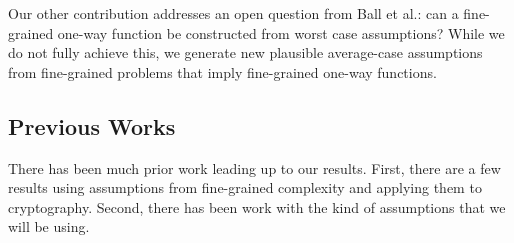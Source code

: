 

Our other contribution addresses an open question from Ball et al.: can a fine-grained one-way function be constructed from worst case assumptions? While we do not fully achieve this, we generate new plausible average-case assumptions from fine-grained problems that imply fine-grained one-way functions. %


\subsection{Previous Works}
There has been much prior work leading up to our results. First, there are a few results using assumptions from fine-grained complexity and applying them to cryptography. Second, there has been work with the kind of assumptions that we will be using. 



